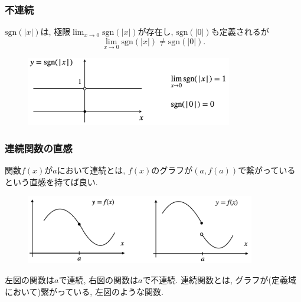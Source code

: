 

\begin{frame}
\frametitle{不連続} 



$\mathrm{sgn}(|x|)$は, 極限$\displaystyle \lim_{x\to 0}\mathrm{sgn}(|x|)$が存在し, $\mathrm{sgn}(|0|)$も定義されるが
$$
\lim_{x\to 0}\mathrm{sgn}(|x|) \neq  \mathrm{sgn}(|0|).
$$ 

\vspace{-1mm}

 \begin{figure}[htbp]
 \begin{center} 
  \includegraphics[width=90mm]{calculus3/sgn_abs.png}
 \end{center}
\end{figure}

\vspace{-1mm}


\end{frame}




\begin{frame}
\frametitle{連続関数の直感} 


関数$f(x)$が$a$において連続とは, $f(x)$のグラフが$(a,f(a))$で繋がっているという直感を持てば良い. 



 \begin{figure}[htbp]
 \begin{center} 
  \includegraphics[width=100mm]{calculus3/(dis)conti.png}
 \end{center}
\end{figure}

左図の関数は$a$で連続, 右図の関数は$a$で不連続. 
連続関数とは, グラフが(定義域において)繋がっている, 左図のような関数. 

\end{frame}



